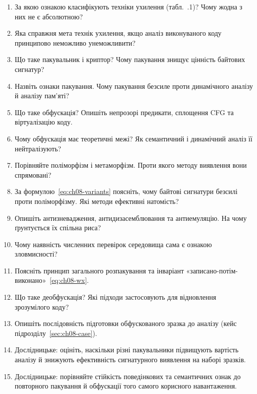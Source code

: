 \selfcheck
\begin{enumerate}
\item За якою ознакою класифікують техніки ухилення (табл.~\thechapter.1)? Чому жодна з них не є абсолютною?
\item Яка справжня мета технік ухилення, якщо аналіз виконуваного коду принципово неможливо унеможливити?
\item Що таке пакувальник і криптор? Чому пакування знищує цінність байтових сигнатур?
\item Назвіть ознаки пакування. Чому пакування безсиле проти динамічного аналізу й аналізу пам'яті?
\item Що таке обфускація? Опишіть непрозорі предикати, сплощення CFG та віртуалізацію коду.
\item Чому обфускація має теоретичні межі? Як семантичний і динамічний аналіз її нейтралізують?
\item Порівняйте поліморфізм і метаморфізм. Проти якого методу виявлення вони спрямовані?
\item За формулою~\eqref{eq:ch08-variants} поясніть, чому байтові сигнатури безсилі проти поліморфізму. Які методи ефективні натомість?
\item Опишіть антизневадження, антидизасемблювання та антиемуляцію. На чому ґрунтується їх спільна риса?
\item Чому наявність численних перевірок середовища сама є ознакою зловмисності?
\item Поясніть принцип загального розпакування та інваріант «записано-потім-виконано»~\eqref{eq:ch08-wx}.
\item Що таке деобфускація? Які підходи застосовують для відновлення зрозумілого коду?
\item Опишіть послідовність підготовки обфускованого зразка до аналізу (кейс підрозділу~\ref{sec:ch08-case}).
\item Дослідницьке: оцініть, наскільки різні пакувальники підвищують вартість аналізу й знижують ефективність сигнатурного виявлення на наборі зразків.
\item Дослідницьке: порівняйте стійкість поведінкових та семантичних ознак до повторного пакування й обфускації того самого корисного навантаження.
\end{enumerate}
